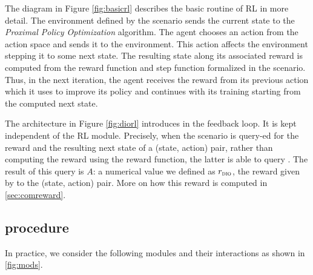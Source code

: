 The diagram in Figure \ref{fig:basicrl} describes the basic routine of RL in more detail. The environment defined by the scenario sends the current state 
to the \emph{Proximal Policy Optimization} algorithm. The agent chooses an action from the action space and sends it to the environment. This action affects the environment stepping it to some next state. 
The resulting state along its associated reward is computed from the reward function and step function formalized in the scenario. Thus, in the next iteration, the 
agent receives the reward from its previous action which it uses to improve its policy and continues with its training starting from the computed next state.  

The architecture in Figure \ref{fig:diorl} introduces \dio{} in the feedback loop. It is kept independent of the RL module. Precisely, when the scenario is query-ed for the reward and 
the resulting next state of a (state, action) pair, rather than
computing the reward using the reward function, the latter is able to
query \dio{}. The result of this query is $A$: a numerical value 
we defined as $r_{\textsc{dio}}{}$, the reward given by \dio{} to the (state, action) pair. More on how this reward is computed in \ref{sec:comreward}.
 

\subsection{\dio{} procedure}
\label{sec:modules}
In practice, we consider the following modules and their interactions as shown in \ref{fig:mods}.


